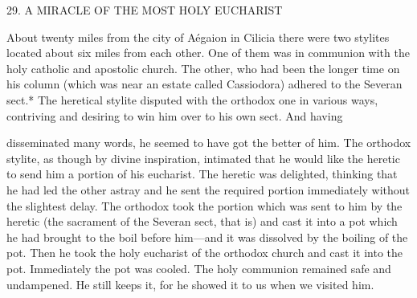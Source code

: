 29. A MIRACLE OF THE MOST HOLY EUCHARIST

About twenty miles from the city of Aégaion in Cilicia there were
two stylites located about six miles from each other. One of them
was in communion with the holy catholic and apostolic church. The
other, who had been the longer time on his column (which was near
an estate called Cassiodora) adhered to the Severan sect.* The
heretical stylite disputed with the orthodox one in various ways,
contriving and desiring to win him over to his own sect. And having

disseminated many words, he seemed to have got the better of him.
The orthodox stylite, as though by divine inspiration, intimated that
he would like the heretic to send him a portion of his eucharist. The
heretic was delighted, thinking that he had led the other astray and
he sent the required portion immediately without the slightest delay.
The orthodox took the portion which was sent to him by the heretic
(the sacrament of the Severan sect, that is) and cast it into a pot
which he had brought to the boil before him—and it was dissolved
by the boiling of the pot. Then he took the holy eucharist of the
orthodox church and cast it into the pot. Immediately the pot was
cooled. The holy communion remained safe and undampened. He
still keeps it, for he showed it to us when we visited him.
